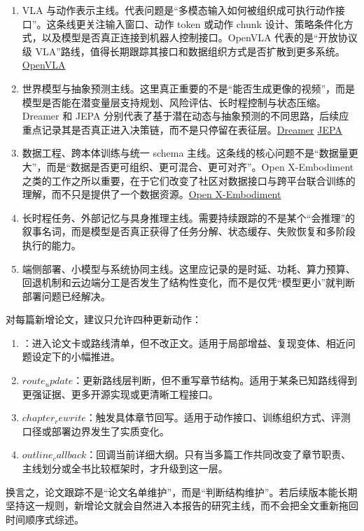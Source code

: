 \begin{enumerate}
\item VLA 与动作表示主线。代表问题是“多模态输入如何被组织成可执行动作接口”。这条线更关注输入窗口、动作 token 或动作 chunk 设计、策略条件化方式，以及模型是否真正连接到机器人控制接口。OpenVLA 代表的是“开放协议级 VLA”路线，值得长期跟踪其接口和数据组织方式是否扩散到更多系统。\href{https://arxiv.org/abs/2406.09246}{OpenVLA}
\item 世界模型与抽象预测主线。这里真正重要的不是“能否生成更像的视频”，而是模型是否能在潜变量层支持规划、风险评估、长时程控制与状态压缩。Dreamer 和 JEPA 分别代表了基于潜在动态与抽象预测的不同思路，后续应重点记录其是否真正进入决策链，而不是只停留在表征层。\href{https://arxiv.org/abs/1912.01603}{Dreamer} \href{https://arxiv.org/abs/2301.08243}{JEPA}
\item 数据工程、跨本体训练与统一 schema 主线。这条线的核心问题不是“数据量更大”，而是“数据是否更可组织、更可混合、更可对齐”。Open X-Embodiment 之类的工作之所以重要，在于它们改变了社区对数据接口与跨平台联合训练的理解，而不只是提供了一个数据资源。\href{https://arxiv.org/abs/2310.08864}{Open X-Embodiment}
\item 长时程任务、外部记忆与具身推理主线。需要持续跟踪的不是某个“会推理”的叙事名词，而是模型是否真正获得了任务分解、状态缓存、失败恢复和多阶段执行的能力。
\item 端侧部署、小模型与系统协同主线。这里应记录的是时延、功耗、算力预算、回退机制和云边端分工是否发生了结构性变化，而不是仅凭“模型更小”就判断部署问题已经解决。
\end{enumerate}

对每篇新增论文，建议只允许四种更新动作：

\begin{enumerate}
\item \texttt{}：进入论文卡或路线清单，但不改正文。适用于局部增益、复现变体、相近问题设定下的小幅推进。
\item \(route_update\)：更新路线层判断，但不重写章节结构。适用于某条已知路线得到更强证据、更多开源实现或更清晰工程接口。
\item \(chapter_rewrite\)：触发具体章节回写。适用于动作接口、训练组织方式、评测口径或部署边界发生了实质变化。
\item \(outline_callback\)：回调当前详细大纲。只有当多篇工作共同改变了章节职责、主线划分或全书比较框架时，才升级到这一层。
\end{enumerate}

换言之，论文跟踪不是“论文名单维护”，而是“判断结构维护”。若后续版本能长期坚持这一规则，新增论文就会自然进入本报告的研究主线，而不会把全文重新拖回时间顺序式综述。


